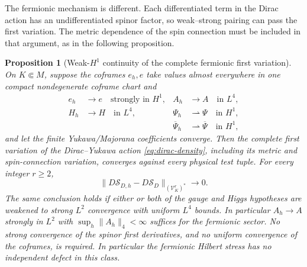 \documentclass[11pt]{article}
\numberwithin{equation}{section}
\newtheorem{proposition}[proposition]{Proposition}
\theoremstyle{definition}
\theoremstyle{remark}
\newcommand{\norm}[1]{\lVert#1\rVert}
\newcommand{\Sact}{\mathscr S}
\newcommand{\Vtest}{\mathscr V}
\newcommand{\bPsi}{\overline\Psi}
\begin{document}
The fermionic mechanism is different. Each differentiated term in the
Dirac action has an undifferentiated spinor factor, so weak--strong pairing
can pass the first variation. The metric dependence of the spin connection
must be included in that argument, as in the following proposition.

\begin{proposition}[Weak-$H^1$ continuity of the complete fermionic first variation]
\label{prop:weak-fermion}
On $K\Subset M$, suppose the coframes $e_h,e$ take values almost everywhere
in one compact nondegenerate coframe chart and
\begin{align*}
 e_h&\to e\quad\text{strongly in }H^1,
 &A_h&\to A\quad\text{in }L^4,\\
 H_h&\to H\quad\text{in }L^4,
 &\Psi_h&\rightharpoonup\Psi\quad\text{in }H^1,\\
 &&\bPsi_h&\rightharpoonup\bPsi\quad\text{in }H^1,
\end{align*}
and let the finite Yukawa/Majorana coefficients converge.  Then the complete
first variation of the Dirac--Yukawa action \eqref{eq:dirac-density},
including its metric and spin-connection variation, converges against every
physical test tuple.  For every integer $r\ge2$,
\begin{equation}
 \norm{D\Sact_{D,h}-D\Sact_D}_{(\Vtest_K^r)^*}\longrightarrow0.
 \label{eq:weak-fermion-variation}
\end{equation}
The same conclusion holds if either or both of the gauge and Higgs
hypotheses are weakened to strong $L^2$ convergence with uniform $L^4$
bounds. In particular $A_h\to A$ strongly in $L^2$ with
$\sup_h\norm{A_h}_4<\infty$ suffices for the fermionic sector.
No strong convergence of
the spinor first derivatives, and no uniform convergence of the coframes,
is required.  In particular the fermionic Hilbert stress has no independent
defect in this class.
\end{proposition}
\end{document}
